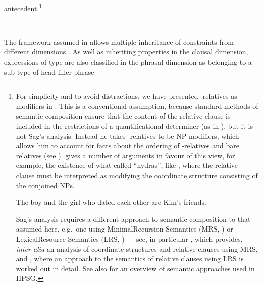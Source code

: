 \documentclass[output=paper,biblatex,babelshorthands,newtxmath,draftmode,colorlinks,citecolor=brown]{langscibook}
\begin{document}
antecedent.\footnote{\label{fn:rc-2}For simplicity and to avoid distractions, we have
  presented -relatives as  modifiers in . This is a conventional
  assumption, because standard methods of semantic composition ensure that the content of
  the relative clause is included in the restrictions of a quantificational determiner (as
  in ), but it is not Sag's analysis. Instead he takes
  -relatives to be NP modifiers, which allows him to account for facts about the
  ordering of -relatives and bare relatives (see
  \citealt[465--469]{Sag:97}). \citet[293--294]{Kiss2005a} gives a number of arguments in
  favour of this view, for example, the existence of what \citet{Link84a-u} called
  ``hydras'', like , where the relative clause must be interpreted as modifying
  the coordinate structure consisting of the conjoined NPs.
  \begin{exe}
    \ex\label{x:rc-45} The boy and the girl who dated each other are
    Kim's friends.
  \end{exe}
  Sag's analysis requires a different approach to semantic composition to that assumed
  here, e.g.\ one using Minimal\indexmrs Recursion Semantics (MRS, \citealt{CFPS2005a}) or Lexical\indexlrs Resource Semantics (LRS, \citealt{richtersailer-lrs04}) --- see, in  particular
  , which provides, \emph{inter alia} an analysis of coordinate structures and
  relative clauses using MRS, and , where an approach to the semantics of relative
  clauses using LRS is worked out in detail. See also  for an overview
  of semantic approaches used in HPSG.}
\begin{exe}\ex\label{x:rc-46}
 \impl\\
 \end{exe}
The framework assumed in  allows multiple inheritance of
constraints from different dimensions \crossrefchapterp[\pageref{properties:page-cross-classification-of-lexemes}]{properties}. As well
as inheriting properties in the clausal dimension, expressions of type  are
also classified in the phrasal dimension as belonging to a sub-type of head-filler phrase
\end{document}
